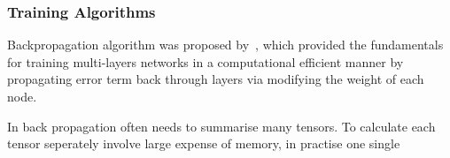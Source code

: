 \subsubsection{Training Algorithms}
Backpropagation algorithm was proposed by~\citet{werbos1975beyond}, which provided the fundamentals for training multi-layers networks in a computational efficient manner by propagating error term back through layers via modifying the weight of each node. 
\par
In back propagation often needs to summarise many tensors. To calculate each tensor seperately involve large expense of memory, in practise one single